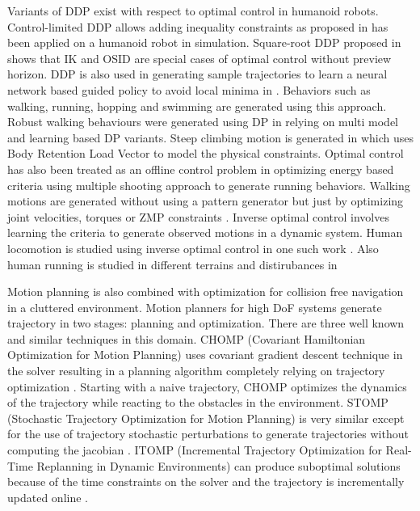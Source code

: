 Variants of DDP exist with respect to optimal control in humanoid robots. Control-limited DDP allows adding inequality constraints as proposed in \cite{tassa2014control}  has been applied on a humanoid robot in simulation. Square-root DDP proposed in \cite{geoffroy2014inverse} shows that IK and OSID are special cases of optimal control without preview horizon. DDP is also used in generating sample trajectories to learn a neural network based guided policy to avoid local minima in \cite{Levine2012}. Behaviors such as walking, running, hopping and swimming are generated using this approach. Robust walking behaviours were generated using DP in \cite{whitman2013coordination} relying on multi model and learning based DP variants. Steep climbing motion is generated in \cite{Noda2014}
which uses Body Retention Load Vector to model the physical constraints. Optimal control has also been treated as an offline control problem in \cite{schultz2010modeling} optimizing energy based criteria using multiple shooting approach to generate running behaviors. Walking motions are generated without using a pattern generator but just by optimizing joint velocities, torques or ZMP constraints \cite{el2013optimal,koch2012studying}. Inverse optimal control involves learning the criteria to generate observed motions in a dynamic system. Human locomotion is studied using inverse optimal control in one such work \cite{mombaur2010human}. Also human running is studied in different terrains and distirubances in \cite{park2013inverse}


Motion planning is also combined with optimization for collision free navigation in a cluttered environment. Motion planners for high DoF systems generate trajectory in two stages: planning and optimization. There are three well known and similar techniques in this domain. CHOMP (Covariant Hamiltonian Optimization for Motion Planning) uses covariant gradient descent technique in the solver resulting in a planning algorithm completely relying on trajectory optimization \cite{zucker2013chomp}. Starting with a naive trajectory, CHOMP optimizes the dynamics of the trajectory while reacting to the obstacles in the environment. STOMP (Stochastic Trajectory Optimization for Motion Planning) is very similar except for the use of trajectory stochastic perturbations to generate trajectories without computing the jacobian \cite{kalakrishnan2011stomp}. ITOMP (Incremental Trajectory Optimization for Real-Time Replanning in Dynamic Environments) can produce suboptimal solutions because of the time constraints on the solver and the trajectory is incrementally updated online \cite{park2014high}.

